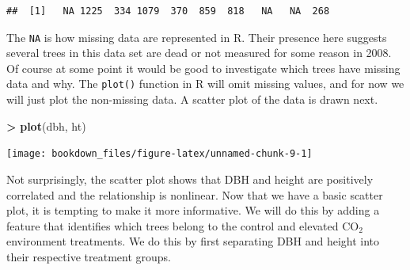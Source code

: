 \documentclass[]{krantz}
\makeatletter
\newenvironment{Shaded}{\begin{snugshade}}{\end{snugshade}}
\newcommand{\KeywordTok}[1]{\textcolor[rgb]{0.27,0.27,0.27}{\textbf{#1}}}
\newcommand{\DecValTok}[1]{\textcolor[rgb]{0.06,0.06,0.06}{#1}}
\newcommand{\StringTok}[1]{\textcolor[rgb]{0.5,0.5,0.5}{#1}}
\newcommand{\OperatorTok}[1]{\textcolor[rgb]{0.43,0.43,0.43}{\textbf{#1}}}
\newcommand{\ErrorTok}[1]{\textcolor[rgb]{0.14,0.14,0.14}{\textbf{#1}}}
\newcommand{\NormalTok}[1]{#1}
\newenvironment{kframe}{%
\medskip{}
\setlength{\fboxsep}{.8em}
 \def\at@end@of@kframe{}%
 \ifinner\ifhmode%
  \def\at@end@of@kframe{\end{minipage}}%
  \begin{minipage}{\columnwidth}%
 \fi\fi%
 \def\FrameCommand##1{\hskip\@totalleftmargin \hskip-\fboxsep
 \colorbox{shadecolor}{##1}\hskip-\fboxsep
     \hskip-\linewidth \hskip-\@totalleftmargin \hskip\columnwidth}%
 \MakeFramed {\advance\hsize-\width
   \@totalleftmargin\z@ \linewidth\hsize
   \@setminipage}}%
 {\par\unskip\endMakeFramed%
 \at@end@of@kframe}
\renewenvironment{Shaded}{\begin{kframe}}{\end{kframe}}
\theoremstyle{definition}
\theoremstyle{definition}
\theoremstyle{definition}
\theoremstyle{remark}
\makeatother
\begin{document}
\begin{verbatim}
##  [1]   NA 1225  334 1079  370  859  818   NA   NA  268
\end{verbatim}

The \texttt{NA} is how missing data are represented in R. Their presence
here suggests several trees in this data set are dead or not measured
for some reason in 2008. Of course at some point it would be good to
investigate which trees have missing data and why. The \texttt{plot()}
function in R will omit missing values, and for now we will just plot
the non-missing data. A scatter plot of the data is drawn next.

\begin{Shaded}
\begin{Highlighting}[]
\OperatorTok{>}\StringTok{ }\KeywordTok{plot}\NormalTok{(dbh, ht)}
\end{Highlighting}
\end{Shaded}

\begin{center}\texttt{[image: bookdown\_files/figure-latex/unnamed-chunk-9-1]} \end{center}

Not surprisingly, the scatter plot shows that DBH and height are
positively correlated and the relationship is nonlinear. Now that we
have a basic scatter plot, it is tempting to make it more informative.
We will do this by adding a feature that identifies which trees belong
to the control and elevated CO\(_2\) environment treatments. We do this
by first separating DBH and height into their respective treatment
groups.

\begin{Shaded}
\end{Shaded}
\end{document}
